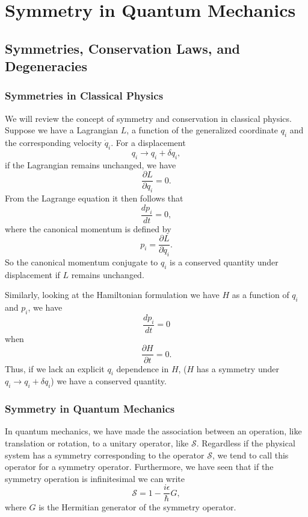 \section{Symmetry in Quantum Mechanics}

\subsection{Symmetries, Conservation Laws, and Degeneracies}
\subsubsection{Symmetries in Classical Physics}
We will review the concept of symmetry and conservation in classical physics. Suppose we have a Lagrangian $L$, a function of the generalized coordinate $q_i$ and the corresponding velocity $\dot{q}_i$. For a displacement
\begin{equation}
    q_i \to q_i + \delta q_i,
\end{equation}
if the Lagrangian remains unchanged, we have
\begin{equation}
    \frac{\partial L}{\partial q_i} = 0.
\end{equation}
From the Lagrange equation it then follows that 
\begin{equation}
    \frac{d p_i}{dt} = 0,
\end{equation}
where the canonical momentum is defined by
\begin{equation}
    p_i = \frac{\partial L}{\partial \dot{q}_i}.
\end{equation}
So the canonical momentum conjugate to $q_i$ is a conserved quantity under displacement if $L$ remains unchanged.

Similarly, looking at the Hamiltonian formulation we have $H$ as a function of $q_i$ and $p_i$, we have
\begin{equation}
    \frac{d p_i}{dt} = 0
\end{equation}
when 
\begin{equation}
    \frac{\partial H}{\partial t} = 0.
\end{equation}
Thus, if we lack an explicit $q_i$ dependence in $H$, ($H$ has a symmetry under $q_i \to q_i + \delta q_i$) we have a conserved quantity.

\subsubsection{Symmetry in Quantum Mechanics}
In quantum mechanics, we have made the association between an operation, like translation or rotation, to a unitary operator, like $\mathscr{S}$. Regardless if the physical system has a symmetry corresponding to the operator $\mathscr{S}$, we tend to call this operator for a symmetry operator. Furthermore, we have seen that if the symmetry operation is infinitesimal we can write
\begin{equation}
    \mathscr{S} = 1 - \frac{i \epsilon}{\hbar} G,
\end{equation}
where $G$ is the Hermitian generator of the symmetry operator. 

